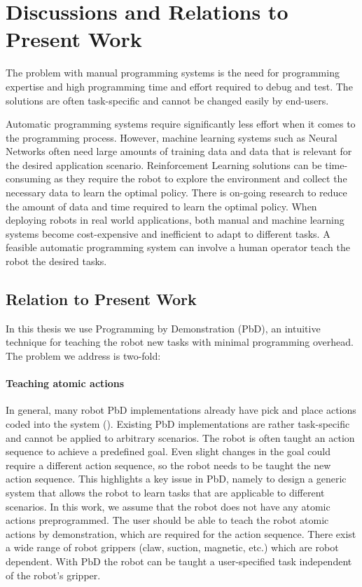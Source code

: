 \section{Discussions and Relations to Present Work}
The problem with manual programming systems is the need for programming expertise and high programming time and effort required to debug and test.
The solutions are often task-specific and cannot be changed easily by end-users.

Automatic programming systems require significantly less effort when it comes to the programming process. 
However, machine learning systems such as Neural Networks often need large amounts of training data and data that is relevant for the desired application scenario.
Reinforcement Learning solutions can be time-consuming as they require the robot to explore the environment and collect the necessary data to learn the optimal policy.
There is on-going research to reduce the amount of data and time required to learn the optimal policy.
When deploying robots in real world applications, both manual and machine learning systems become cost-expensive and inefficient to adapt to different tasks.
A feasible automatic programming system can involve a human operator teach the robot the desired tasks.

\subsection{Relation to Present Work}
In this thesis we use Programming by Demonstration (PbD), an intuitive technique for teaching the robot new tasks with minimal programming overhead.
The problem we address is two-fold:
\paragraph{Teaching atomic actions}
In general, many robot PbD implementations already have pick and place actions coded into the system (\cite{veeraraghavan2008teaching}).
Existing PbD implementations are rather task-specific and cannot be applied to arbitrary scenarios.
The robot is often taught an action sequence to achieve a predefined goal.
Even slight changes in the goal could require a different action sequence, so the robot needs to be taught the new action sequence.
This highlights a key issue in PbD, namely to design a generic system that allows the robot to learn tasks that are applicable to different scenarios.
In this work, we assume that the robot does not have any atomic actions preprogrammed.
The user should be able to teach the robot atomic actions by demonstration, which are required for the action sequence.
There exist a wide range of robot grippers (claw, suction, magnetic, etc.) which are robot dependent.
With PbD the robot can be taught a user-specified task independent of the robot's gripper.

